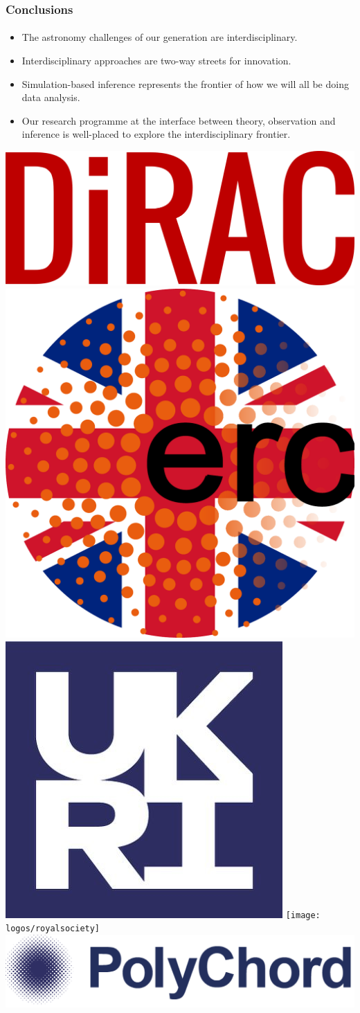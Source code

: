 \documentclass[aspectratio=169, handout]{beamer}
\begin{document}
\begin{frame}
    \frametitle{Conclusions}
    \framesubtitle{}
    \begin{itemize}
        \item The astronomy challenges of our generation are interdisciplinary.
        \item Interdisciplinary approaches are two-way streets for innovation.
        \item Simulation-based inference represents the frontier of how we will all be doing data analysis.
        \item Our research programme at the interface between theory, observation and inference is well-placed to explore the interdisciplinary frontier.
    \end{itemize}
    \vspace{10pt}

    \includegraphics[height=0.09\textwidth]{logos/dirac.png}%
    \includegraphics[height=0.09\textwidth]{logos/ukerc}
    \includegraphics[height=0.09\textwidth]{logos/ukri}
    \texttt{[image: logos/royalsociety]}
    \includegraphics[height=0.09\textwidth]{logos/polychord}


\end{frame}
\end{document}
